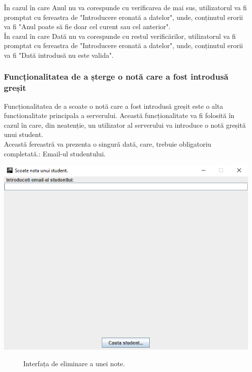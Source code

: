 \documentclass{article}
\begin{document}
		În cazul în care Anul nu va corespunde cu verificarea de mai sus, utilizatorul va fi promptat cu fereastra de "Introducere eronată a datelor", unde, conținutul erorii va fi "Anul poate să fie doar cel curent sau cel anterior". \\

		În cazul în care Dată nu va corespunde cu restul verificărilor, utilizatorul va fi promptat cu fereastra de "Introducere eronată a datelor", unde, conținutul erorii va fi "Dată introdusă nu este valida".

		\subsubsection{Funcționalitatea de a șterge o notă care a fost introdusă greșit}

	Funcționalitatea de a scoate o notă care a fost introdusă greșit este o alta functionalitate principala a serverului. Această funcționalitate va fi folosită în cazul în care, din neatenție, un utilizator al serverului va introduce o notă greșită unui student.\\

	Această fereastră va prezenta o singură dată, care, trebuie obligatoriu completată.: Email-ul studentului.

	\begin{center}
		\includegraphics[scale=0.5]{Source/ServerScoate}
		\begin{figure}[!h]
			{\caption*{Interfața de eliminare a unei note.}}
		\end{figure}
	\end{center}
\end{document}
